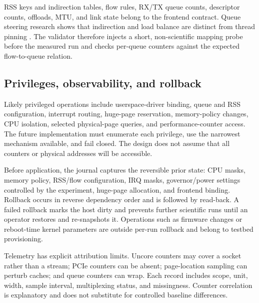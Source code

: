 RSS keys and indirection tables, flow rules, RX/TX queue counts, descriptor counts, offloads, MTU, and link state belong to the frontend contract. Queue steering research shows that indirection and load balance are distinct from thread pinning \cite{barbette2019rsspp}. The validator therefore injects a short, non-scientific mapping probe before the measured run and checks per-queue counters against the expected flow-to-queue relation.

\subsection{Privileges, observability, and rollback}

Likely privileged operations include userspace-driver binding, queue and RSS configuration, interrupt routing, huge-page reservation, memory-policy changes, CPU isolation, selected physical-page queries, and performance-counter access. The future implementation must enumerate each privilege, use the narrowest mechanism available, and fail closed. The design does not assume that all counters or physical addresses will be accessible.

Before application, the journal captures the reversible prior state: CPU masks, memory policy, RSS/flow configuration, IRQ masks, governor/power settings controlled by the experiment, huge-page allocation, and frontend binding. Rollback occurs in reverse dependency order and is followed by read-back. A failed rollback marks the host dirty and prevents further scientific runs until an operator restores and re-snapshots it. Operations such as firmware changes or reboot-time kernel parameters are outside per-run rollback and belong to testbed provisioning.

Telemetry has explicit attribution limits. Uncore counters may cover a socket rather than a stream; PCIe counters can be absent; page-location sampling can perturb caches; and queue counters can wrap. Each record includes scope, unit, width, sample interval, multiplexing status, and missingness. Counter correlation is explanatory and does not substitute for controlled baseline differences.
